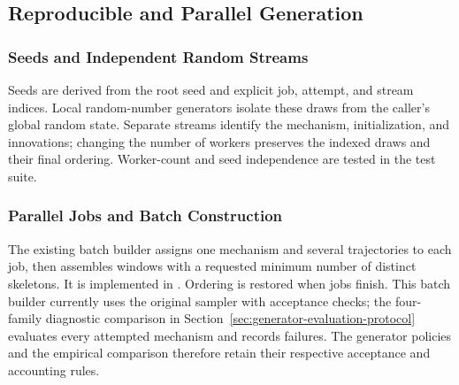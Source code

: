 \subsection{Reproducible and Parallel Generation}
\label{sec:generator-parallel}

\subsubsection{Seeds and Independent Random Streams}
Seeds are derived from the root seed and explicit job, attempt, and stream
indices. Local random-number generators isolate these draws from the
caller's global random state. Separate streams identify the mechanism,
initialization, and innovations; changing the number of workers preserves
the indexed draws and their final ordering. Worker-count and seed
independence are tested in the test suite.

\subsubsection{Parallel Jobs and Batch Construction}
The existing batch builder assigns one mechanism and several trajectories to
each job, then assembles windows with a requested minimum number of distinct
skeletons. It is implemented in
. Ordering is restored when jobs
finish. This batch builder currently uses the original sampler with acceptance
checks; the four-family diagnostic comparison in
Section~\ref{sec:generator-evaluation-protocol} evaluates every attempted
mechanism and records failures. The generator policies and the empirical
comparison therefore retain their respective acceptance and accounting rules.
